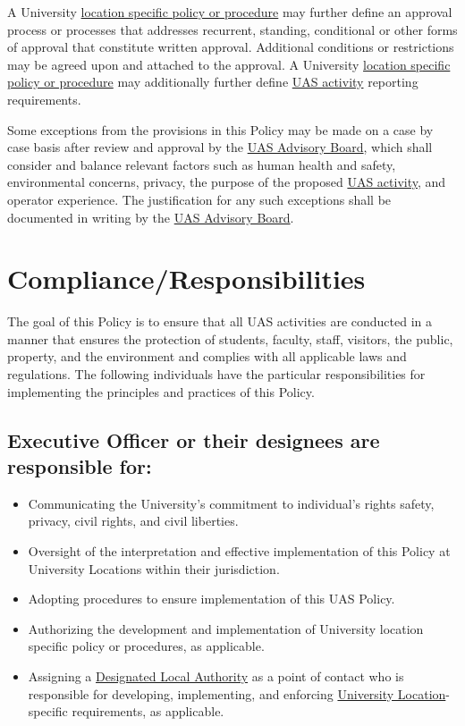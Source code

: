 \documentclass[
]{book}
\providecommand{\tightlist}{%
  \setlength{\itemsep}{0pt}\setlength{\parskip}{0pt}}
\begin{document}
A University \protect\hyperlink{LSP}{location specific policy or procedure} may further define an approval process or processes that addresses recurrent, standing, conditional or other forms of approval that constitute written approval. Additional conditions or restrictions may be agreed upon and attached to the approval. A University \protect\hyperlink{LSP}{location specific policy or procedure} may additionally further define \protect\hyperlink{UASactivity}{UAS activity} reporting requirements.

Some exceptions from the provisions in this Policy may be made on a case by case basis after review and approval by the \protect\hyperlink{AB}{UAS Advisory Board}, which shall consider and balance relevant factors such as human health and safety, environmental concerns, privacy, the purpose of the proposed \protect\hyperlink{UASactivity}{UAS activity}, and operator experience. The justification for any such exceptions shall be documented in writing by the \protect\hyperlink{AB}{UAS Advisory Board}.

\hypertarget{complianceresponsibilities}{%
\section{Compliance/Responsibilities}\label{complianceresponsibilities}}

The goal of this Policy is to ensure that all UAS activities are conducted in a manner that ensures the protection of students, faculty, staff, visitors, the public, property, and the environment and complies with all applicable laws and regulations.
The following individuals have the particular responsibilities for implementing the principles and practices of this Policy.

\hypertarget{executive-officer-or-their-designees-are-responsible-for}{%
\subsection{Executive Officer or their designees are responsible for:}\label{executive-officer-or-their-designees-are-responsible-for}}

\begin{itemize}
\tightlist
\item
  Communicating the University's commitment to individual's rights safety, privacy, civil rights, and civil liberties.
\item
  Oversight of the interpretation and effective implementation of this Policy at University Locations within their jurisdiction.
\item
  Adopting procedures to ensure implementation of this UAS Policy.
\item
  Authorizing the development and implementation of University location specific policy or procedures, as applicable.
\item
  Assigning a \protect\hyperlink{DLA}{Designated Local Authority} as a point of contact who is responsible for developing, implementing, and enforcing \protect\hyperlink{UL}{University Location}-specific requirements, as applicable.
\end{itemize}
\end{document}
